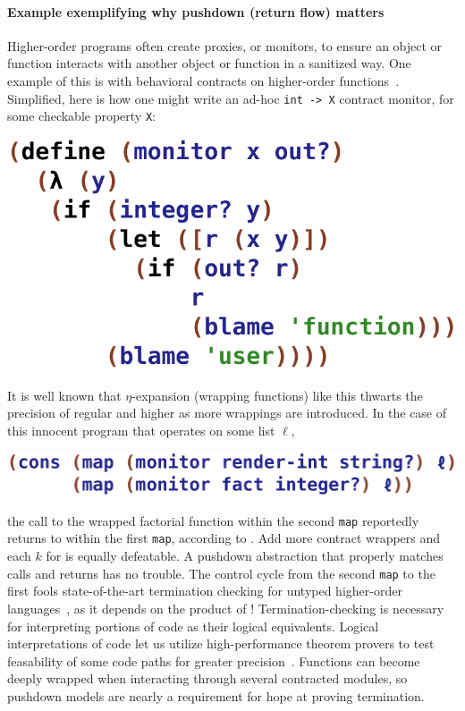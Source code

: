 \paragraph{Example exemplifying why pushdown (return flow) matters}
Higher-order programs often create proxies, or monitors, to ensure an object or function interacts with another object or function in a sanitized way.
%
One example of this is with behavioral contracts on higher-order functions~\citep{dvanhorn:Findler2002Contracts}.
%
Simplified, here is how one might write an ad-hoc \texttt{int -> X} contract monitor, for some checkable property \texttt{X}:
\begin{center}
 \includegraphics[scale=0.45]{monitor}
\end{center}
It is well known that $\eta$-expansion (wrapping functions) like this thwarts the precision of regular \zcfa{} and higher \kcfa{} as more wrappings are introduced.
%
In the case of this innocent program that operates on some list \texttt{$\ell$},
\begin{center}
 \includegraphics[scale=0.45]{pair}
\end{center}
the call to the wrapped factorial function within the second \texttt{map} reportedly returns to within the first \texttt{map}, according to \zcfa{}.
%
Add more contract wrappers and each $k$ for \kcfa{} is equally defeatable.
%
A pushdown abstraction that properly matches calls and returns has no trouble.
%
The control cycle from the second \texttt{map} to the first fools state-of-the-art termination checking for untyped higher-order languages~\citep{ianjohnson:DBLP:conf/aplas/SereniJ05}, as it depends on the product of \zcfa{}!
%
Termination-checking is necessary for interpreting portions of code as their logical equivalents.
%
Logical interpretations of code let us utilize high-performance theorem provers to test feasability of some code paths for greater precision~\citep{liquid-haskell}.
%
Functions can become deeply wrapped when interacting through several contracted modules, so pushdown models are nearly a requirement for hope at proving termination.